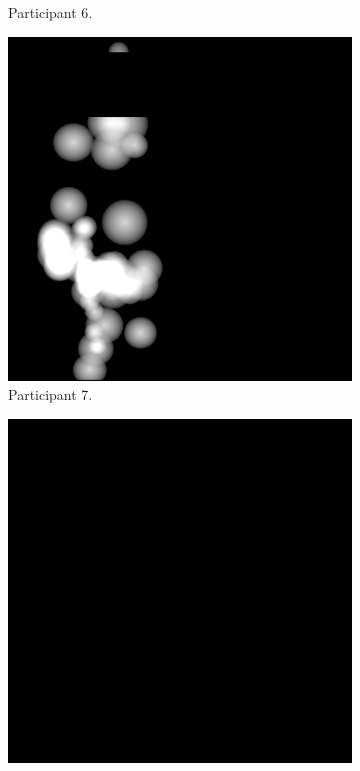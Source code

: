 \begin{figure}[!ht]
\begin{subfigure}[b]{0.24\textwidth}
        \caption{Participant 6.}
    \end{subfigure}
    \hfill    
    \begin{subfigure}[b]{0.24\textwidth}
        \centering
        \includegraphics[width=\textwidth]{img/data/Panel14/single/7.png}
        \caption{Participant 7.}
    \end{subfigure}
    \hfill    
    \begin{subfigure}[b]{0.24\textwidth}
        \centering
        \includegraphics[width=\textwidth]{img/data/Panel14/single/8.png}

\end{subfigure}
\end{figure}

